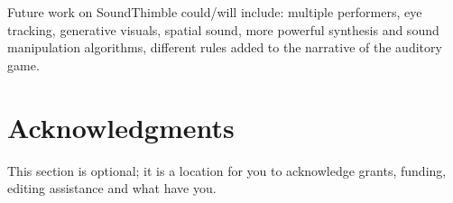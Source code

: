 \documentclass{nime-alternate}
\begin{document}
Future work on SoundThimble could/will include: multiple performers, eye tracking, generative visuals, spatial sound, more powerful synthesis and sound manipulation algorithms, different rules added to the narrative of the auditory game.


\section{Acknowledgments}
This section is optional; it is a location for you
to acknowledge grants, funding, editing assistance and
what have you. 

%

 

\end{document}

